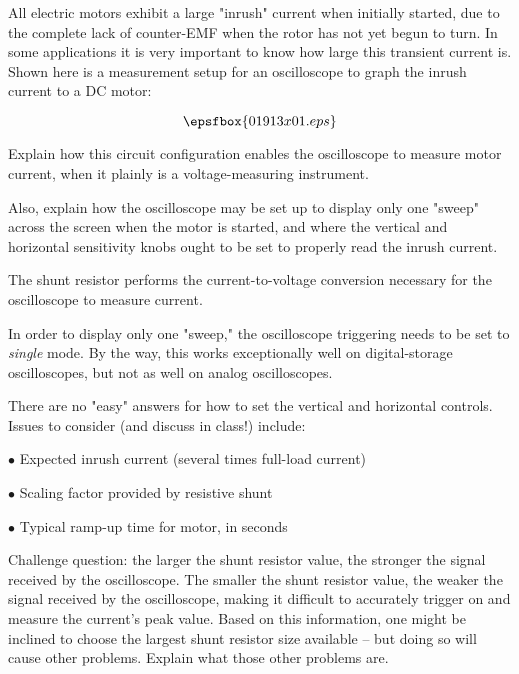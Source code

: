 

All electric motors exhibit a large "inrush" current when initially started, due to the complete lack of counter-EMF when the rotor has not yet begun to turn.  In some applications it is very important to know how large this transient current is.  Shown here is a measurement setup for an oscilloscope to graph the inrush current to a DC motor:

$$\epsfbox{01913x01.eps}$$

Explain how this circuit configuration enables the oscilloscope to measure motor current, when it plainly is a voltage-measuring instrument.  

Also, explain how the oscilloscope may be set up to display only one "sweep" across the screen when the motor is started, and where the vertical and horizontal sensitivity knobs ought to be set to properly read the inrush current.







The shunt resistor performs the current-to-voltage conversion necessary for the oscilloscope to measure current.

\vskip 10pt

In order to display only one "sweep," the oscilloscope triggering needs to be set to {\it single} mode.  By the way, this works exceptionally well on digital-storage oscilloscopes, but not as well on analog oscilloscopes.

There are no "easy" answers for how to set the vertical and horizontal controls.  Issues to consider (and discuss in class!) include:

\medskip
\item{$\bullet$} Expected inrush current (several times full-load current)
\item{$\bullet$} Scaling factor provided by resistive shunt
\item{$\bullet$} Typical ramp-up time for motor, in seconds
\medskip

\vskip 10pt

Challenge question: the larger the shunt resistor value, the stronger the signal received by the oscilloscope.  The smaller the shunt resistor value, the weaker the signal received by the oscilloscope, making it difficult to accurately trigger on and measure the current's peak value.  Based on this information, one might be inclined to choose the largest shunt resistor size available -- but doing so will cause other problems.  Explain what those other problems are.

